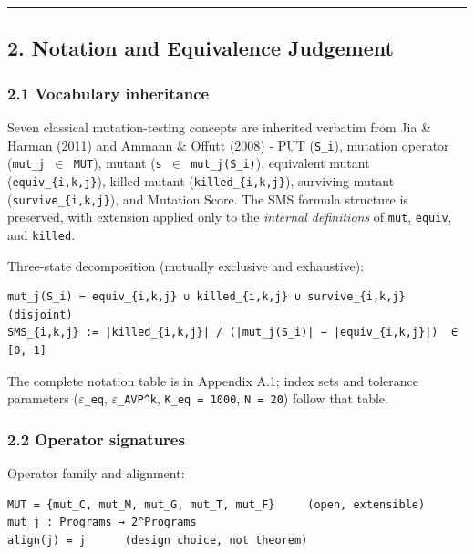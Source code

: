 \documentclass[review,12pt,authoryear]{elsarticle}
\begin{document}
\begin{center}\rule{0.5\linewidth}{0.5pt}\end{center}

\subsection{2. Notation and Equivalence
Judgement}\label{notation-and-equivalence-judgement}

\subsubsection{2.1 Vocabulary inheritance}\label{vocabulary-inheritance}

Seven classical mutation-testing concepts are inherited verbatim from
Jia \& Harman (2011) and Ammann \& Offutt (2008) - PUT (\texttt{S\_i}),
mutation operator (\texttt{mut\_j\ $\in$\ MUT}), mutant
(\texttt{s\textquotesingle{}\ $\in$\ mut\_j(S\_i)}), equivalent mutant
(\texttt{equiv\_\{i,k,j\}}), killed mutant (\texttt{killed\_\{i,k,j\}}),
surviving mutant (\texttt{survive\_\{i,k,j\}}), and Mutation Score. The
SMS formula structure is preserved, with extension applied only to the
\emph{internal definitions} of \texttt{mut}, \texttt{equiv}, and
\texttt{killed}.

Three-state decomposition (mutually exclusive and exhaustive):

\begin{verbatim}
mut_j(S_i) = equiv_{i,k,j} ∪ killed_{i,k,j} ∪ survive_{i,k,j}   (disjoint)
SMS_{i,k,j} := |killed_{i,k,j}| / (|mut_j(S_i)| − |equiv_{i,k,j}|)  ∈ [0, 1]
\end{verbatim}

The complete notation table is in Appendix A.1; index sets and tolerance
parameters (\texttt{$\varepsilon$\_eq}, \texttt{$\varepsilon$\_AVP\^{}k},
\texttt{K\_eq\ =\ 1000}, \texttt{N\ =\ 20}) follow that table.

\subsubsection{2.2 Operator signatures}\label{operator-signatures}

Operator family and alignment:

\begin{verbatim}
MUT = {mut_C, mut_M, mut_G, mut_T, mut_F}     (open, extensible)
mut_j : Programs → 2^Programs
align(j) = j      (design choice, not theorem)
\end{verbatim}
\end{document}

